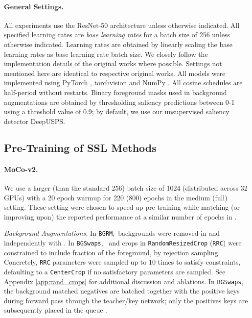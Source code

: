 \documentclass[twoside,11pt]{article}
\newcommand{\bgrm}{\texttt{BG\textunderscore RM}}
\newcommand{\bgswaps}{\texttt{BG\textunderscore Swaps}}
\newcommand{\moco}{MoCo-v2}
\begin{document}
\paragraph{General Settings.} All experiments use the ResNet-50 \citep{resnet} architecture unless otherwise indicated. All specified learning rates are \textit{base learning rates} for a batch size of 256 unless otherwise indicated. Learning rates are obtained by linearly scaling the base learning rates as base learning rate  batch size. We closely follow the implementation details of the original works where possible. Settings not mentioned here are identical to respective original works. All models were implemented using PyTorch \citep{pytorch_cite}, torchvision \citep{marcel_torchvision_2010} and NumPy \citep{numpy}. All cosine schedules \citep{loshchilov_sgdr_2016} are half-period without restarts. Binary foreground masks used in background augmentations are obtained by thresholding saliency predictions between 0-1 using a threshold value of 0.9; by default, we use our unsupervised saliency detector DeepUSPS.

\subsection{Pre-Training of SSL Methods}

\paragraph{\moco.} We use a larger (than the standard 256) batch size of 1024 (distributed across 32 GPUs) with a 20 epoch warmup for 220 (800) epochs in the medium (full) setting. These setting were chosen to speed up pre-training while matching (or improving upon) the reported performance at a similar number of epochs in \citet{chen2020mocov2}. 

{\it Background Augmentations.} In \bgrm,~backgrounds were removed in  and  independently with . In \bgswaps,~ and crops in \texttt{RandomResizedCrop} (\texttt{RRC}) were constrained to include  fraction of the foreground, by rejection sampling. Concretely, \texttt{RRC} parameters were sampled up to 10 times to satisfy constraints, defaulting to a \texttt{CenterCrop} if no satisfactory parameters are sampled. See Appendix \ref{app:rand_crops} for additional discussion and ablations. In \bgswaps, the background matched negatives are batched together with the positive keys during forward pass through the teacher/key network; only the positives keys are subsequently placed in the queue .
\end{document}
